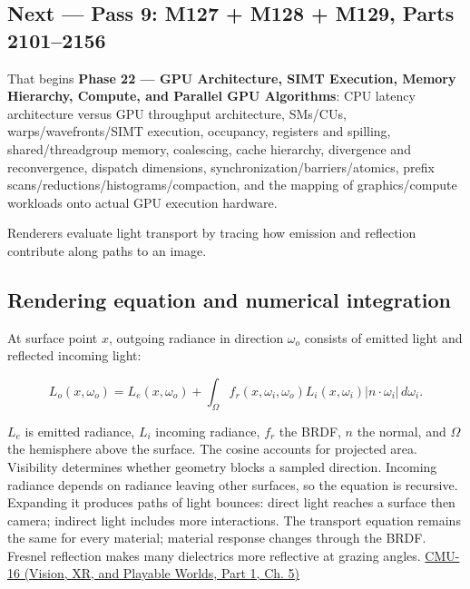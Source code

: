\subsection{Next --- Pass 9: M127 + M128 + M129, Parts 2101--2156}\label{03-visual-computing-i-ch011-next-pass-9-m127-m128-m129-parts-21012156}

\hypertarget{03-visual-computing-i-ch011-next-pass-9-m127-m128-m129-parts-21012156}{}

That begins \textbf{Phase 22 --- GPU Architecture, SIMT Execution, Memory Hierarchy, Compute, and Parallel GPU Algorithms}: CPU latency architecture versus GPU throughput architecture, SMs/CUs, warps/wavefronts/SIMT execution, occupancy, registers and spilling, shared/threadgroup memory, coalescing, cache hierarchy, divergence and reconvergence, dispatch dimensions, synchronization/barriers/atomics, prefix scans/reductions/histograms/compaction, and the mapping of graphics/compute workloads onto actual GPU execution hardware.

Renderers evaluate light transport by tracing how emission and reflection contribute along paths to an image.

\subsection{Rendering equation and numerical integration}\label{03-visual-computing-i-ch011-rendering-equation-and-numerical-integration}

\hypertarget{03-visual-computing-i-ch011-rendering-equation-and-numerical-integration}{}

At surface point \(x\), outgoing radiance in direction \(\omega_o\) consists of emitted light and reflected incoming light:

\[
L_o(x,\omega_o)=L_e(x,\omega_o)+\int_\Omega f_r(x,\omega_i,\omega_o)L_i(x,\omega_i)|n\cdot\omega_i|\,d\omega_i.
\]

\(L_e\) is emitted radiance, \(L_i\) incoming radiance, \(f_r\) the BRDF, \(n\) the normal, and \(\Omega\) the hemisphere above the surface. The cosine accounts for projected area. Visibility determines whether geometry blocks a sampled direction. Incoming radiance depends on radiance leaving other surfaces, so the equation is recursive. Expanding it produces paths of light bounces: direct light reaches a surface then camera; indirect light includes more interactions. The transport equation remains the same for every material; material response changes through the BRDF. Fresnel reflection makes many dielectrics more reflective at grazing angles. \href{../07-Vision-XR-and-Playable-Worlds-P01/main.pdf\#nameddest=04-visual-computing-ii-ch036-cmu-16---the-rendering-equation}{CMU-16 (Vision, XR, and Playable Worlds, Part 1, Ch. 5)}

